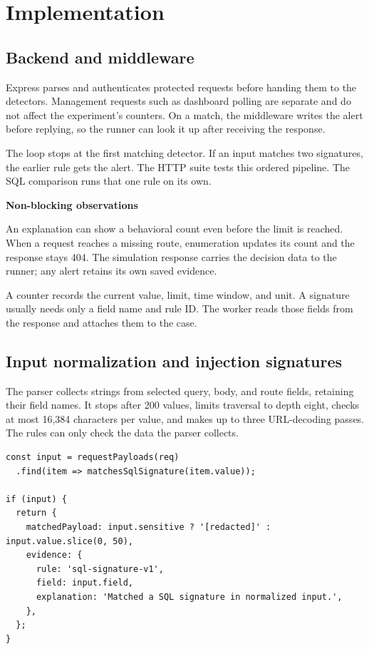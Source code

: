 \documentclass[11pt,a4paper,oneside]{report}
\newcommand{\topic}[1]{\par\addvspace{4pt}\noindent\textbf{#1}\par\nobreak\vspace{-.20em}}
\newcommand{\sheet}[1]{\clearpage\section{#1}}
\begin{document}
\chapter{Implementation}
\section{Backend and middleware}
Express parses and authenticates protected requests before handing them to the detectors. Management requests such as dashboard polling are separate and do not affect the experiment's counters. On a match, the middleware writes the alert before replying, so the runner can look it up after receiving the response.



The loop stops at the first matching detector. If an input matches two signatures, the earlier rule gets the alert. The HTTP suite tests this ordered pipeline. The SQL comparison runs that one rule on its own.

\topic{Non-blocking observations}
An explanation can show a behavioral count even before the limit is reached. When a request reaches a missing route, enumeration updates its count and the response stays 404. The simulation response carries the decision data to the runner; any alert retains its own saved evidence.



A counter records the current value, limit, time window, and unit. A signature usually needs only a field name and rule ID. The worker reads those fields from the response and attaches them to the case.

\sheet{Input normalization and injection signatures}
The parser collects strings from selected query, body, and route fields, retaining their field names. It stops after 200 values, limits traversal to depth eight, checks at most 16,384 characters per value, and makes up to three URL-decoding passes. The rules can only check the data the parser collects.

\begin{lstlisting}[caption={Adapted evidence construction from server/detectors/sqli.ts}]
const input = requestPayloads(req)
  .find(item => matchesSqlSignature(item.value));

if (input) {
  return {
    matchedPayload: input.sensitive ? '[redacted]' : input.value.slice(0, 50),
    evidence: {
      rule: 'sql-signature-v1',
      field: input.field,
      explanation: 'Matched a SQL signature in normalized input.',
    },
  };
}
\end{lstlisting}
\end{document}

